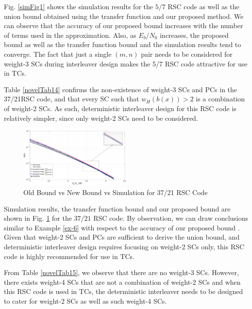 Fig. \ref{simFig1} shows the simulation results for the $5/7$ RSC code as well as the union bound obtained using the transfer function and our proposed method. We can observe that the accuracy of our proposed bound increases with the number of terms used in the approximation. Also, as $E_b/N_0$ increases, the proposed bound as well as the transfer function bound and the simulation results tend to converge. The fact that just a single $(m,n)$ pair needs to be considered for weight-3 SCs during interleaver design makes the 5/7 RSC code attractive for use in TCs.
\label{ex-6}


Table \ref{novelTab14} confirms the non-existence of weight-3 SCs and PCs in the 37/21RSC code, and that every SC such that $w_H(b(x)) > 2$ is a combination of weight-2 SCs. As such, deterministic interleaver design for this RSC code is relatively simpler, since only weight-2 SCs need to be considered.
\begin{figure}[htbp]
	\centering
	\includegraphics[width=0.5\textwidth]{./Images/RSC_37_21_lower_weights3.eps}
	\caption{Old Bound vs New Bound vs Simulation for 37/21 RSC Code}
	\label{simFig2}
\end{figure}

Simulation results, the transfer function bound and our proposed bound are shown in Fig. \ref{simFig2} for the $37/21$ RSC code. By observation, we can draw conclusions similar to  Example \ref{ex-6} with respect to the accuracy of our proposed bound . Given that weight-2 SCs and PCs are sufficient to derive the union bound, and deterministic interleaver design requires focusing on weight-2 SCs only, this RSC code is highly recommended for use in TCs.

From Table \ref{novelTab15}, we observe that there are no weight-3 SCs. However, there exists weight-4 SCs that are not a combination of weight-2 SCs and when this RSC code is used in TCs, the deterministic interleaver needs to be designed to cater for weight-2 SCs as well as such weight-4 SCs. 
 
